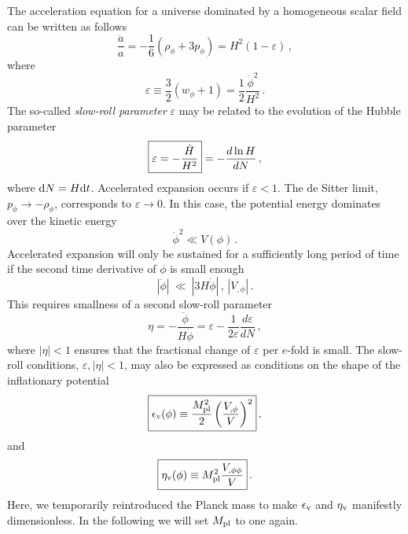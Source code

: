 \documentclass[12pt,letterpaper,rotate]{article}
\def\beq{\begin{equation}}
\def\eeq{\end{equation}}
\def\d{{\rm d}}
\begin{document}
{The acceleration equation for a universe dominated by a homogeneous scalar field can be written as follows
\beq
\frac{\ddot a}{a} = - \frac{1}{6} (\rho_\phi + 3 p_\phi) = H^2 (1-\varepsilon)\, ,
\eeq
where
\beq
\varepsilon \equiv \frac{3}{2} (w_\phi + 1) = \frac{1}{2} \frac{\dot \phi^2}{H^2}\, .
\eeq
The so-called {\it slow-roll parameter} $\varepsilon$ may be related to the evolution of the Hubble parameter
\beq
\fbox{$\displaystyle
\varepsilon = - \frac{\dot H}{H^2}$} = - \frac{d \ln H}{d N}\, ,
\eeq
where $\d N = H \d t$.
Accelerated expansion occurs if $\varepsilon < 1$. The de Sitter limit, $p_\phi \to - \rho_\phi$, corresponds to $\varepsilon \to 0$.
In this case, the potential energy dominates over the kinetic energy
\beq
\dot \phi^2 \ll V(\phi)\, .
\eeq
Accelerated expansion will only be sustained for a sufficiently long period of time if  the second time derivative of $\phi$ is small enough 
\beq
|\ddot{\phi}| \ \ll \ |3H \dot{\phi}|\, , \, |V_{,\phi}|\, .
\eeq
This requires smallness of a second slow-roll parameter
\beq
\eta = - \frac{\ddot \phi}{H \dot \phi} = \varepsilon - \frac{1}{2 \varepsilon} \frac{d \varepsilon}{d N}\, ,
\eeq
where $|\eta| < 1$ ensures that the fractional change of $\varepsilon$ per $e$-fold is small.
The slow-roll conditions, $\varepsilon, |\eta| < 1$, may also be expressed as conditions on the shape of the inflationary potential
\begin{equation}
\fbox{$\displaystyle \epsilon_{\rm v}(\phi) \equiv \frac{M_{\rm pl}^2}{2} \left(\frac{V_{,\phi}}{V}\right)^2 $}\, ,
\end{equation}
and
\begin{equation}
\fbox{$\displaystyle
\eta_{\rm v}(\phi) \equiv M_{\rm pl}^2 \frac{V_{,\phi\phi}}{V} $}\, .
\end{equation}
Here, we temporarily reintroduced the Planck mass to make $\epsilon_{\rm v}$ and $\eta_{\rm v}$ manifestly dimensionless.
In the following we will set $M_{\rm pl}$ to one again.
}
\end{document}
